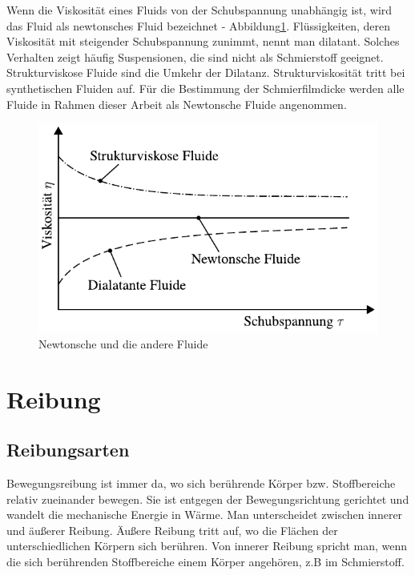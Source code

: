 Wenn die Viskosität eines Fluids von der Schubspannung unabhängig ist, wird das Fluid als newtonsches Fluid bezeichnet - Abbildung\ref{fig:newtonsche_fluide}.
Flüssigkeiten, deren Viskosität mit steigender Schubspannung zunimmt, nennt man dilatant.
Solches Verhalten zeigt häufig Suspensionen, die sind nicht als Schmierstoff geeignet.
Strukturviskose Fluide sind die Umkehr der Dilatanz.
Strukturviskosität tritt bei synthetischen Fluiden auf.
Für die Bestimmung der Schmierfilmdicke werden alle Fluide in Rahmen dieser Arbeit als Newtonsche Fluide angenommen.
\begin{figure}[htb]
    \centering
    \includegraphics[]{./images/newtonsche_nichtnewtonsche_fluide.pdf}
    \caption{Newtonsche und die andere Fluide\cite{wisniewski}}
    \label{fig:newtonsche_fluide}
\end{figure}
%

\section{Reibung}
\label{sec:reibung}

\subsection{Reibungsarten}
\label{sub:reibungsarten}

Bewegungsreibung ist immer da, wo sich berührende Körper bzw. Stoffbereiche relativ zueinander bewegen.
Sie ist entgegen der Bewegungsrichtung gerichtet und wandelt die mechanische Energie in Wärme.
Man unterscheidet zwischen innerer und äußerer Reibung.
Äußere Reibung tritt auf, wo die Flächen der unterschiedlichen Körpern sich berühren.
Von innerer Reibung spricht man, wenn die sich berührenden Stoffbereiche einem Körper angehören, z.B im Schmierstoff.


